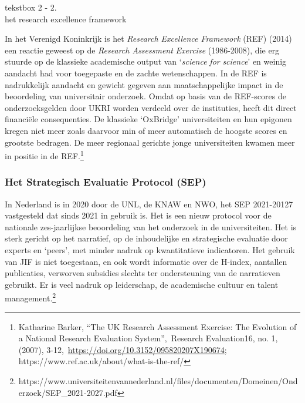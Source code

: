 \documentclass{jote-book}
\begin{document}
	\begin{bookbox}{\raggedright tekstbox 2 - 2. \\het research excellence framework}
		In het Verenigd Koninkrijk is het \emph{Research Excellence Framework} (REF) (2014) een reactie geweest op de \emph{Research Assessment }\emph{Exercise} (1986-2008), die erg stuurde op de klassieke academische output van ‘\emph{science}\emph{ }\emph{for}\emph{ }\emph{science}' en weinig aandacht had voor toegepaste en de zachte wetenschappen. In de REF is nadrukkelijk aandacht en gewicht gegeven aan maatschappelijke impact in de beoordeling van universitair onderzoek. Omdat op basis van de REF-scores de onderzoeksgelden door UKRI worden verdeeld over de instituties, heeft dit direct financiële consequenties. De klassieke ‘OxBridge' universiteiten en hun epigonen kregen niet meer zoals daarvoor min of meer automatisch de hoogste scores en grootste bedragen. De meer regionaal gerichte jonge universiteiten kwamen meer in positie in de REF.\footnote{Katharine Barker, “The UK Research Assessment Exercise: The Evolution of a National Research Evaluation System”, Research Evaluation16, no. 1, (2007), 3-12, \href{https://doi.org/10.3152/095820207X190674}{https://doi.org/10.3152/095820207X190674}; https://www.ref.ac.uk/about/what-is-the-ref/}
	\end{bookbox}

	\subsubsection{Het Strategisch Evaluatie Protocol (SEP)}



	In Nederland is in 2020 door de UNL, de KNAW en NWO, het SEP 2021-20127 vastgesteld dat sinds 2021 in gebruik is. Het is een nieuw protocol voor de nationale zes-jaarlijkse beoordeling van het onderzoek in de universiteiten. Het is sterk gericht op het narratief, op de inhoudelijke en strategische evaluatie door experts en ‘peers', met minder nadruk op kwantitatieve indicatoren. Het gebruik van JIF is niet toegestaan, en ook wordt informatie over de H-index, aantallen publicaties, verworven subsidies slechts ter ondersteuning van de narratieven gebruikt. Er is veel nadruk op leiderschap, de academische cultuur en talent management.\footnote{https://www.universiteitenvannederland.nl/files/documenten/Domeinen/Onderzoek/SEP\_2021-2027.pdf}
\end{document}
